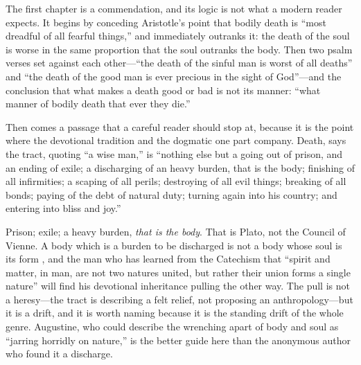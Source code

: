 The first chapter is a commendation, and its logic is not what a modern reader expects. It begins by conceding Aristotle's point that bodily death is ``most dreadful of all fearful things,'' and immediately outranks it: the death of the soul is worse in the same proportion that the soul outranks the body. Then two psalm verses set against each other---``the death of the sinful man is worst of all deaths'' and ``the death of the good man is ever precious in the sight of God''---and the conclusion that what makes a death good or bad is not its manner: ``what manner of bodily death that ever they die.''

Then comes a passage that a careful reader should stop at, because it is the point where the devotional tradition and the dogmatic one part company. Death, says the tract, quoting ``a wise man,'' is ``nothing else but a going out of prison, and an ending of exile; a discharging of an heavy burden, that is the body; finishing of all infirmities; a scaping of all perils; destroying of all evil things; breaking of all bonds; paying of the debt of natural duty; turning again into his country; and entering into bliss and joy.''

Prison; exile; a heavy burden, \emph{that is the body}. That is Plato, not the Council of Vienne. A body which is a burden to be discharged is not a body whose soul is its form , and the man who has learned from the Catechism that ``spirit and matter, in man, are not two natures united, but rather their union forms a single nature'' will find his devotional inheritance pulling the other way. The pull is not a heresy---the tract is describing a felt relief, not proposing an anthropology---but it is a drift, and it is worth naming because it is the standing drift of the whole genre. Augustine, who could describe the wrenching apart of body and soul as ``jarring horridly on nature,'' is the better guide here than the anonymous author who found it a discharge.

